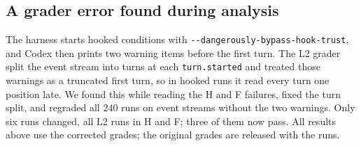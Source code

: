 \subsection{A grader error found during analysis}

The harness starts hooked conditions with \texttt{-{}-dangerously-bypass-\allowbreak hook-trust}, and Codex then prints two warning items before the first turn. The L2 grader split the event stream into turns at each \texttt{turn.started} and treated those warnings as a truncated first turn, so in hooked runs it read every turn one position late. We found this while reading the H and F failures, fixed the turn split, and regraded all 240 runs on event streams without the two warnings. Only six runs changed, all L2 runs in H and F; three of them now pass. All results above use the corrected grades; the original grades are released with the runs.



